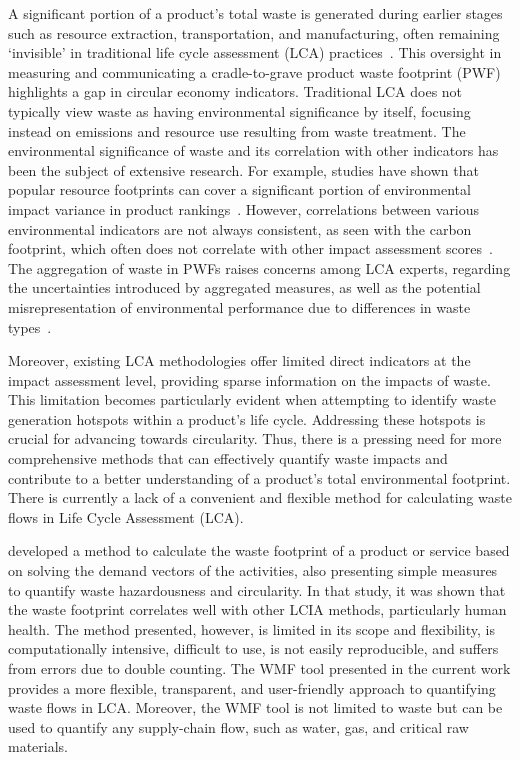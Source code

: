 A significant portion of a product's total waste is generated during earlier stages such as resource extraction, transportation, and manufacturing, often remaining `invisible' in traditional life cycle assessment (LCA) practices~\citep{laurenti2016wastefootprint}. This oversight in measuring and communicating a cradle-to-grave product waste footprint (PWF) highlights a gap in circular economy indicators. Traditional LCA does not typically view waste as having environmental significance by itself, focusing instead on emissions and resource use resulting from waste treatment. The environmental significance of waste and its correlation with other indicators has been the subject of extensive research. For example, studies have shown that popular resource footprints can cover a significant portion of environmental impact variance in product rankings~\citep{steinmann2017resourcefootprints}. However, correlations between various environmental indicators are not always consistent, as seen with the carbon footprint, which often does not correlate with other impact assessment scores~\citep{laurent2012carbonfootprint}. The aggregation of waste in PWFs raises concerns among LCA experts, regarding the uncertainties introduced by aggregated measures, as well as the potential misrepresentation of environmental performance due to differences in waste types~\citep{chen2021methoduncertainty,huijbregts2010energyfootprint}.

Moreover, existing LCA methodologies offer limited direct indicators at the impact assessment level, providing sparse information on the impacts of waste. This limitation becomes particularly evident when attempting to identify waste generation hotspots within a product's life cycle. Addressing these hotspots is crucial for advancing towards circularity. Thus, there is a pressing need for more comprehensive methods that can effectively quantify waste impacts and contribute to a better understanding of a product's total environmental footprint.
There is currently a lack of a convenient and flexible method for calculating waste flows in Life Cycle Assessment (LCA). 

\cite{laurenti2023wastefootprint} developed a method to calculate the waste footprint of a product or service based on solving the demand vectors of the activities, also presenting simple measures to quantify waste hazardousness and circularity. In that study, it was shown that the waste footprint correlates well with other LCIA methods, particularly human health. The method presented, however, is limited in its scope and flexibility, is computationally intensive, difficult to use, is not easily reproducible, and suffers from errors due to double counting. The WMF tool presented in the current work provides a more flexible, transparent, and user-friendly approach to quantifying waste flows in LCA. Moreover, the WMF tool is not limited to waste but can be used to quantify any supply-chain flow, such as water, gas, and critical raw materials. 

